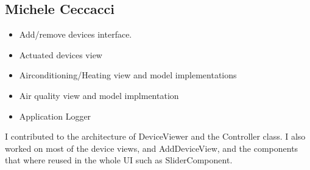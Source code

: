 \subsection{Michele Ceccacci}
\begin{itemize}
	\item Add/remove devices interface.
	\item Actuated devices view
	\item Airconditioning/Heating view and model implementations
	\item Air quality view and model implmentation
	\item Application Logger 
\end{itemize}

I contributed to the architecture of DeviceViewer and the Controller class.
I also worked on most of the device views, and AddDeviceView, and the components that
where reused in the whole UI such as SliderComponent.
